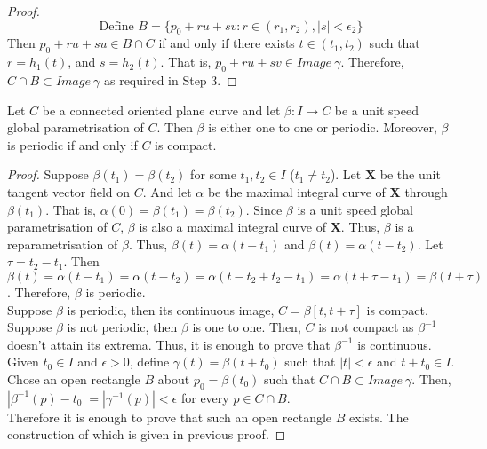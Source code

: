 \begin{proof}
	\begin{equation}
		\text{Define } B = \{ p_0 + ru + sv : r \in (r_1,r_2), |s| < \epsilon_2 \}
	\end{equation}
	Then $p_0 + ru + su \in B \cap C$ if and only if there exists $t \in (t_1,t_2)$ such that $r = h_1(t)$, and $s=h_2(t)$.
	That is, $p_0 + ru + sv \in Image\ \gamma$.
	Therefore, $C \cap B \subset Image\ \gamma$ as required in Step 3.
\end{proof}

\begin{theorem}
	Let $C$ be a connected oriented plane curve and let $\beta : I \to C$ be a unit speed global parametrisation of $C$.
	Then $\beta$ is either one to one or periodic.
	Moreover, $\beta$ is periodic if and only if $C$ is compact.
\end{theorem}
\begin{proof}
	Suppose $\beta(t_1) = \beta(t_2)$ for some $t_1,t_2 \in I$ ($t_1 \ne t_2$).
	Let $\mathbf{X}$ be the unit tangent vector field on $C$.
	And let $\alpha$ be the maximal integral curve of $\mathbf{X}$ through $\beta(t_1)$.
	That is, $\alpha(0) = \beta(t_1) = \beta(t_2)$.
	Since $\beta$ is a unit speed global parametrisation of $C$, $\beta$ is also a maximal integral curve of $\mathbf{X}$.
	Thus, $\beta$ is a reparametrisation of $\beta$.
	Thus, $\beta(t) = \alpha(t-t_1)$ and $\beta(t) = \alpha(t-t_2)$.
	Let $\tau = t_2-t_1$.
	Then $\beta(t) = \alpha(t-t_1) = \alpha(t-t_2) = \alpha(t-t_2+t_2-t_1) = \alpha(t+\tau-t_1) = \beta(t+\tau)$.
	Therefore, $\beta$ is periodic. \\


	Suppose $\beta$ is periodic, then its continuous image, $C = \beta[t,t+\tau]$ is compact.
	Suppose $\beta$ is not periodic, then $\beta$ is one to one.
	Then, $C$ is not compact as $\beta^{-1}$ doesn't attain its extrema.
	Thus, it is enough to prove that $\beta^{-1}$ is continuous.\\


	Given $t_0 \in I$ and $\epsilon > 0$, define $\gamma(t) = \beta(t+t_0)$ such that $|t| < \epsilon$ and $t+t_0 \in I$.
	Chose an open rectangle $B$ about $p_0 = \beta(t_0)$ such that $C \cap B \subset Image\ \gamma$.
	Then, $|\beta^{-1}(p) - t_0 | = | \gamma^{-1}(p) | < \epsilon$ for every $p \in C \cap B$.\\


	Therefore it is enough to prove that such an open rectangle $B$ exists.
	The construction of which is given in previous proof.
\end{proof}

